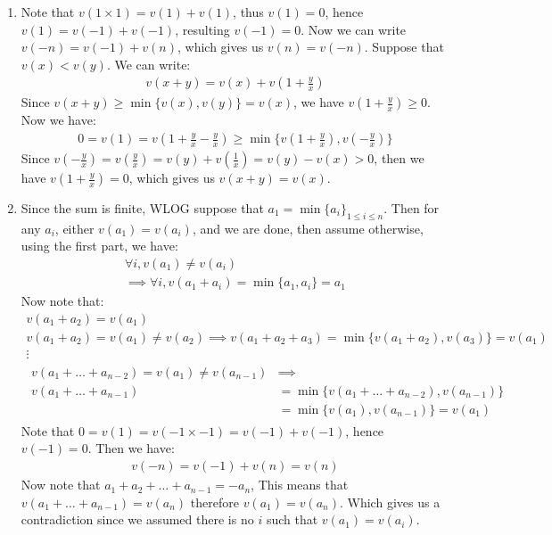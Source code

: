 \begin{enumerate}[label=\ilabel]
    \item 
        Note that $v(1 \times 1) = v(1) + v(1)$, thus $v(1) =0$, hence $v(1) = v(-1) + v(-1)$, resulting $v(-1) = 0$. Now we can write $v(-n) = v(-1) + v(n)$, which gives us $v(n) = v(-n)$.
        Suppose that $v(x) < v(y)$.
        We can write:
        \begin{gather*}
            v(x + y) = v(x) + v(1 + \frac{y}{x})
        \end{gather*}
        Since $v(x + y) \ge \min \{v(x), v(y) \} = v(x)$, we have $v(1 + \frac{y}{x}) \ge 0$. 
        Now we have:
        \begin{gather*}
            0 = v(1) = v(1 + \frac{y}{x} - \frac{y}{x}) \ge \min \{v(1 + \frac{y}{x}), v(- \frac{y}{x}) \}
        \end{gather*}
        Since $v(-\frac{y}{x}) = v(\frac{y}{x}) = v(y) + v(\frac{1}{x}) = v(y) - v(x) > 0$, then we have $v(1 + \frac{y}{x}) = 0$, which gives us $v(x + y) = v(x)$.
    \item 
        Since the sum is finite, WLOG suppose that $a_1 = \min \{a_i\}_{1 \le i \le n}$. Then for any $a_i$, either $v(a_1) = v(a_i)$, and we are done, then assume otherwise, using the first part, we have:
        \begin{gather*}
            \forall i, v(a_1) \ne v(a_i) \\
            \implies \forall i, v(a_1 + a_i) = \min \{a_1, a_i \} = a_1
        \end{gather*}
        Now note that:
        \begin{gather*}
            v(a_1 + a_2) = v(a_1) \\
            v(a_1 + a_2) = v(a_1) \ne v(a_2) \implies v(a_1 + a_2 + a_3) = \min \{ v(a_1 + a_2), v(a_3) \} = v(a_1) \\
            \vdots \\
            \begin{split}
                v(a_1 + \dots + a_{n - 2}) = v(a_1) \ne v(a_{n - 1}) & \implies \\
                v(a_1 + \dots + a_{n - 1}) & = \min \{ v(a_1 + \dots + a_{n - 2}), v(a_{n - 1}) \} \\
                & = \min \{v(a_1) , v(a_{n - 1}) \} = v(a_1)
            \end{split}
        \end{gather*}
        Note that $0 = v(1) = v(-1 \times -1) = v(-1) + v(-1)$, hence $v(-1) = 0$. Then we have:
        \begin{gather*}
            v(-n) = v(-1) + v(n) = v(n)
        \end{gather*}
        Now note that $a_1 + a_2 + \dots + a_{n - 1} = - a_n$, This means that $v(a_1 + \dots + a_{n - 1}) = v(a_n)$ therefore $v(a_1) = v(a_n)$. Which gives us a contradiction since we assumed there is no $i$ such that $v(a_1) = v(a_i)$.  
\end{enumerate}